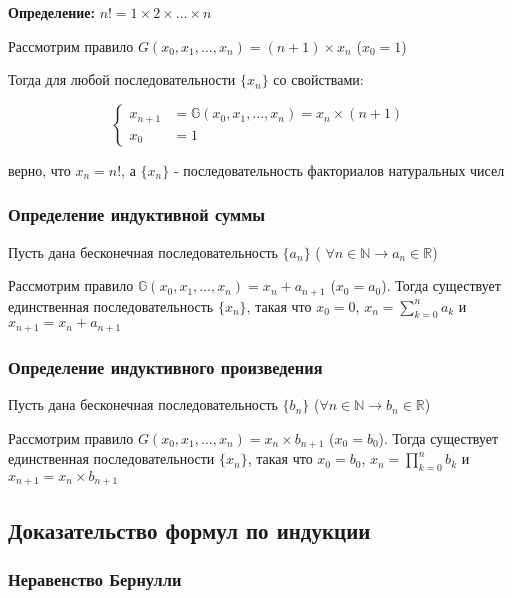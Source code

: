 \documentclass[class=article,a4paper,12pt,crop=false]{standalone}
\begin{document}
\textbf{Определение:} $n! = 1 \times 2 \times \dots \times n$

Рассмотрим правило $G(x_0, x_1, \dots, x_n) = (n + 1)\times x_n$ ($x_0 = 1$)

Тогда для любой последовательности $\{x_n\}$ со свойствами:

\begin{equation}
  \begin{cases}
    x_{n + 1} & = \mathbb{G}(x_0, x_1, \dots, x_n) = x_n\times(n + 1) \\
    x_0 & = 1
  \end{cases}
\end{equation}

верно, что $x_n = n!$, а $\{x_n\}$ - последовательность факториалов натуральных чисел

\subsubsection{Определение индуктивной суммы}

Пусть дана бесконечная последовательность $\{a_n\}$ (
$\forall n \in \mathbb{N} \rightarrow  a_n \in \mathbb{R}$)

Рассмотрим правило $\mathbb{G}(x_0, x_1, \dots, x_n) = x_n + a_{n + 1}$
($x_0 = a_0$). Тогда существует единственная последовательность $\{x_n\}$,
такая что $x_0 = 0$, $x_n = \sum\limits_{k=0}^n{a_k}$ и $x_{n + 1} = x_n + a_{n + 1}$

\subsubsection{Определение индуктивного произведения}

Пусть дана бесконечная последовательность $\{b_n\}$
($\forall n \in \mathbb{N} \rightarrow b_n \in \mathbb{R}$)

Рассмотрим правило $G(x_0, x_1, \dots, x_n) = x_n\times b_{n+1}$
($x_0 = b_0$). Тогда существует единственная последовательности $\{x_n\}$,
такая что $x_0 = b_0$, $x_n = \prod\limits_{k=0}^n{b_k}$ и $x_{n + 1} = x_n \times b_{n + 1}$

\subsection{Доказательство формул по индукции}

\subsubsection{Неравенство Бернулли}
\end{document}
